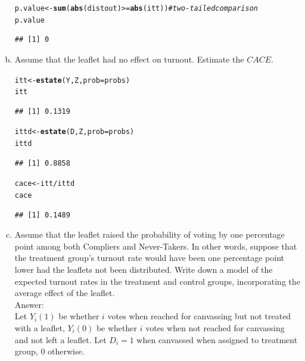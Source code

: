\documentclass[11pt,notitlepage]{article}\usepackage[]{graphicx}\usepackage[]{color}
\makeatletter
\newcommand{\hlcom}[1]{\textcolor[rgb]{0.678,0.584,0.686}{\textit{#1}}}%
\newcommand{\hlopt}[1]{\textcolor[rgb]{0,0,0}{#1}}%
\newcommand{\hlstd}[1]{\textcolor[rgb]{0.345,0.345,0.345}{#1}}%
\newcommand{\hlkwb}[1]{\textcolor[rgb]{0.69,0.353,0.396}{#1}}%
\newcommand{\hlkwc}[1]{\textcolor[rgb]{0.333,0.667,0.333}{#1}}%
\newcommand{\hlkwd}[1]{\textcolor[rgb]{0.737,0.353,0.396}{\textbf{#1}}}%
\newenvironment{kframe}{%
 \def\at@end@of@kframe{}%
 \ifinner\ifhmode%
  \def\at@end@of@kframe{\end{minipage}}%
  \begin{minipage}{\columnwidth}%
 \fi\fi%
 \def\FrameCommand##1{\hskip\@totalleftmargin \hskip-\fboxsep
 \colorbox{shadecolor}{##1}\hskip-\fboxsep
     \hskip-\linewidth \hskip-\@totalleftmargin \hskip\columnwidth}%
 \MakeFramed {\advance\hsize-\width
   \@totalleftmargin\z@ \linewidth\hsize
   \@setminipage}}%
 {\par\unskip\endMakeFramed%
 \at@end@of@kframe}
\newenvironment{knitrout}{}{} %
\makeatother
\begin{document}
\begin{enumerate}[a)]
\begin{knitrout}
\begin{kframe}
\begin{alltt}
\hlstd{p.value} \hlkwb{<-} \hlkwd{sum}\hlstd{(}\hlkwd{abs}\hlstd{(distout)} \hlopt{>=} \hlkwd{abs}\hlstd{(itt))}        \hlcom{# two-tailed comparison}
\hlstd{p.value}
\end{alltt}
\begin{verbatim}
## [1] 0
\end{verbatim}
\end{kframe}
\end{knitrout}

\item Assume that the leaflet had no effect on turnout. Estimate the $CACE$.
\begin{knitrout}
\color{fgcolor}\begin{kframe}
\begin{alltt}
\hlstd{itt} \hlkwb{<-} \hlkwd{estate}\hlstd{(Y,Z,}\hlkwc{prob}\hlstd{=probs)}
\hlstd{itt}
\end{alltt}
\begin{verbatim}
## [1] 0.1319
\end{verbatim}
\begin{alltt}
\hlstd{ittd} \hlkwb{<-} \hlkwd{estate}\hlstd{(D,Z,}\hlkwc{prob}\hlstd{=probs)}
\hlstd{ittd}
\end{alltt}
\begin{verbatim}
## [1] 0.8858
\end{verbatim}
\begin{alltt}
\hlstd{cace} \hlkwb{<-} \hlstd{itt}\hlopt{/}\hlstd{ittd}
\hlstd{cace}
\end{alltt}
\begin{verbatim}
## [1] 0.1489
\end{verbatim}
\end{kframe}
\end{knitrout}
\item Assume that the leaflet raised the probability of voting by one percentage point among both Compliers and Never-Takers. In other words, suppose that the treatment group's turnout rate would have been one percentage point lower had the leaflets not been distributed. Write down a model of the expected turnout rates in the treatment and control groups, incorporating the average effect of the leaflet.\\
Answer:\\
Let $Y_i(1)$ be whether $i$ votes when reached for canvassing but not treated with a leaflet, $Y_i(0)$ be whether $i$ votes when not reached for canvassing and not left a leaflet. Let $D_i = 1$ when canvassed when assigned to treatment group, 0 otherwise.\\

\end{enumerate}
\end{document}
